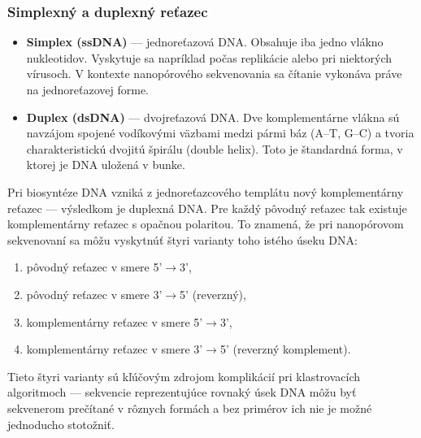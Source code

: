 \subsubsection{Simplexný a duplexný reťazec}
\begin{itemize}
    \item \textbf{Simplex (ssDNA)} --- jednoreťazová DNA. Obsahuje iba jedno vlákno nukleotidov. Vyskytuje sa napríklad počas replikácie alebo pri niektorých vírusoch. V kontexte nanopórového sekvenovania sa čítanie vykonáva práve na jednoreťazovej forme.
    \item \textbf{Duplex (dsDNA)} --- dvojreťazová DNA. Dve komplementárne vlákna sú navzájom spojené vodíkovými väzbami medzi pármi báz (A--T, G--C) a tvoria charakteristickú dvojitú špirálu (double helix). Toto je štandardná forma, v ktorej je DNA uložená v bunke.
\end{itemize}

Pri biosyntéze DNA vzniká z jednoreťazcového templátu nový komplementárny reťazec --- výsledkom je duplexná DNA. Pre každý pôvodný reťazec tak existuje komplementárny reťazec s opačnou polaritou. To znamená, že pri nanopórovom sekvenovaní sa môžu vyskytnúť štyri varianty toho istého úseku DNA:
\begin{enumerate}
    \item pôvodný reťazec v smere 5'$\rightarrow$3',
    \item pôvodný reťazec v smere 3'$\rightarrow$5' (reverzný),
    \item komplementárny reťazec v smere 5'$\rightarrow$3',
    \item komplementárny reťazec v smere 3'$\rightarrow$5' (reverzný komplement).
\end{enumerate}

Tieto štyri varianty sú kľúčovým zdrojom komplikácií pri klastrovacích algoritmoch --- sekvencie reprezentujúce rovnaký úsek DNA môžu byť sekvenerom prečítané v rôznych formách a bez primérov ich nie je možné jednoducho stotožniť.
